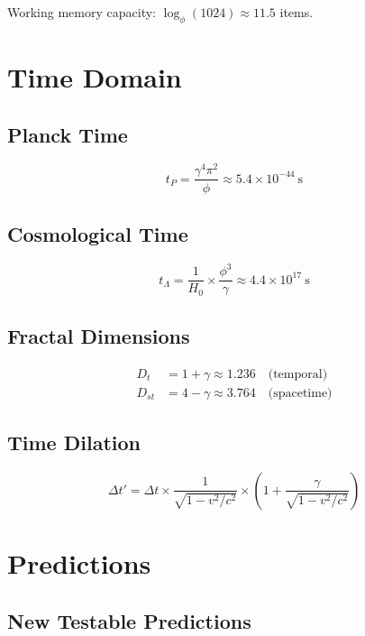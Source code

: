 \documentclass[12pt,a4paper]{article}
\begin{document}
Working memory capacity: $\log_\phi(1024) \approx 11.5$ items.

\section{Time Domain}

\subsection{Planck Time}

\begin{equation}
t_P = \frac{\gamma^4 \pi^2}{\phi} \approx 5.4 \times 10^{-44}~\text{s}
\end{equation}

\subsection{Cosmological Time}

\begin{equation}
t_\Lambda = \frac{1}{H_0} \times \frac{\phi^3}{\gamma} \approx 4.4 \times 10^{17}~\text{s}
\end{equation}

\subsection{Fractal Dimensions}

\begin{align}
D_t &= 1 + \gamma \approx 1.236 \quad \text{(temporal)} \\
D_{st} &= 4 - \gamma \approx 3.764 \quad \text{(spacetime)}
\end{align}

\subsection{Time Dilation}

\begin{equation}
\Delta t' = \Delta t \times \frac{1}{\sqrt{1 - v^2/c^2}} \times \left(1 + \frac{\gamma}{\sqrt{1 - v^2/c^2}}\right)
\end{equation}

\section{Predictions}

\subsection{New Testable Predictions}
\end{document}
